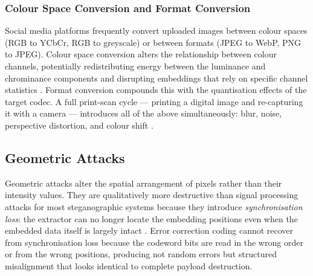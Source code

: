 \documentclass[12pt,a4paper,oneside]{report}
\begin{document}
	
	\subsubsection{Colour Space Conversion and Format Conversion}
	
	Social media platforms frequently convert uploaded images between colour spaces (RGB to
	YCbCr, RGB to greyscale) or between formats (JPEG to WebP, PNG to JPEG). Colour space
	conversion alters the relationship between colour channels, potentially redistributing energy
	between the luminance and chrominance components and disrupting embeddings that rely on
	specific channel statistics \cite{cox2007digital}. Format conversion compounds this with
	the quantisation effects of the target codec. A full print-scan cycle — printing a digital
	image and re-capturing it with a camera — introduces all of the above simultaneously: blur,
	noise, perspective distortion, and colour shift \cite{wengrowski2019light}.
	
	\subsection{Geometric Attacks}
	\label{subsec:geometric_attacks}
	
	Geometric attacks alter the spatial arrangement of pixels rather than their intensity values.
	They are qualitatively more destructive than signal processing attacks for most steganographic
	systems because they introduce \emph{synchronisation loss}: the extractor can no longer locate
	the embedding positions even when the embedded data itself is largely intact
	\cite{ruanaidh1998rotation, cox2007digital}. Error correction coding cannot recover from
	synchronisation loss because the codeword bits are read in the wrong order or from the wrong
	positions, producing not random errors but structured misalignment that looks identical to
	complete payload destruction.
	
\end{document}
